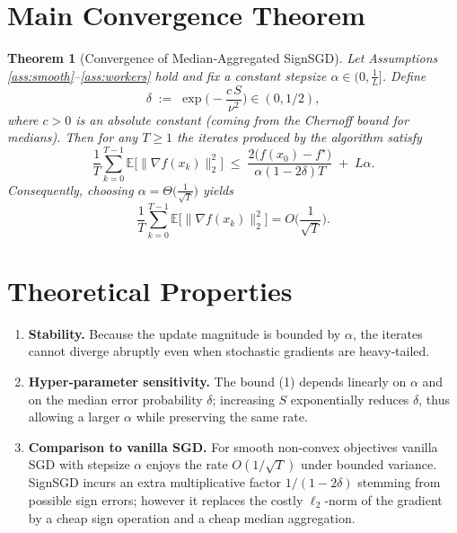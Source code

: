 \documentclass[11pt]{article}
\newcommand{\E}{\mathbb{E}}
\newtheorem{theorem}{Theorem}
\begin{document}
\section*{Main Convergence Theorem}
\begin{theorem}[Convergence of Median‑Aggregated SignSGD]\label{thm:main}
Let Assumptions \ref{ass:smooth}–\ref{ass:workers} hold and fix a constant stepsize
$\alpha\in\big(0,\frac{1}{L}\big]$. Define
\[
    \delta \;:=\; \exp\!\Big(-\frac{c\,S}{\nu^{2}}\Big)\in(0,1/2),
\]
where $c>0$ is an absolute constant (coming from the Chernoff bound for medians).  
Then for any $T\ge 1$ the iterates produced by the algorithm satisfy
\[
    \frac{1}{T}\sum_{k=0}^{T-1}\E\!\big[\|\nabla f(x_{k})\|_{2}^{2}\big]
    \;\le\;
    \frac{2\big(f(x_{0})-f^{\star}\big)}{\alpha(1-2\delta)T}
    \;+\;
    L\alpha .
\tag{1}
\]
Consequently, choosing $\alpha = \Theta\!\big(\tfrac{1}{\sqrt{T}}\big)$ yields
\[
    \frac{1}{T}\sum_{k=0}^{T-1}\E\!\big[\|\nabla f(x_{k})\|_{2}^{2}\big]
    = O\!\Big(\frac{1}{\sqrt{T}}\Big).
\]
\end{theorem}

\section*{Theoretical Properties}
\begin{enumerate}[label=\arabic*.]
    \item \textbf{Stability.} Because the update magnitude is bounded by $\alpha$, the iterates cannot diverge abruptly even when stochastic gradients are heavy‑tailed.
    \item \textbf{Hyper‑parameter sensitivity.} The bound (1) depends linearly on $\alpha$ and on the median error probability $\delta$; increasing $S$ exponentially reduces $\delta$, thus allowing a larger $\alpha$ while preserving the same rate.
    \item \textbf{Comparison to vanilla SGD.} For smooth non‑convex objectives vanilla SGD with stepsize $\alpha$ enjoys the rate $O(1/\sqrt{T})$ under bounded variance. SignSGD incurs an extra multiplicative factor $1/(1-2\delta)$ stemming from possible sign errors; however it replaces the costly $\ell_{2}$‑norm of the gradient by a cheap sign operation and a cheap median aggregation.
\end{enumerate}
\end{document}
